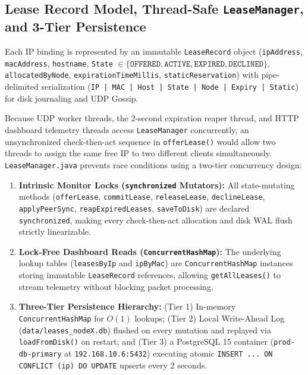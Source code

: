 \documentclass[11pt,a4paper]{article}
\begin{document}
\subsection{Lease Record Model, Thread-Safe \texttt{LeaseManager}, and 3-Tier Persistence}
Each IP binding is represented by an immutable \texttt{LeaseRecord} object (\texttt{ipAddress}, \texttt{macAddress}, \texttt{hostname}, \texttt{State} $\in \{\texttt{OFFERED}, \texttt{ACTIVE}, \texttt{EXPIRED}, \texttt{DECLINED}\}$, \texttt{allocatedByNode}, \texttt{expirationTimeMillis}, \texttt{staticReservation}) with pipe-delimited serialization (\texttt{IP | MAC | Host | State | Node | Expiry | Static}) for disk journaling and UDP Gossip.

Because UDP worker threads, the 2-second expiration reaper thread, and HTTP dashboard telemetry threads access \texttt{LeaseManager} concurrently, an unsynchronized check-then-act sequence in \texttt{offerLease()} would allow two threads to assign the same free IP to two different clients simultaneously. \texttt{LeaseManager.java} prevents race conditions using a two-tier concurrency design:
\begin{enumerate}[leftmargin=2em]
    \item \textbf{Intrinsic Monitor Locks (\texttt{synchronized} Mutators):} All state-mutating methods (\texttt{offerLease}, \texttt{commitLease}, \texttt{releaseLease}, \texttt{declineLease}, \texttt{applyPeerSync}, \texttt{reapExpiredLeases}, \texttt{saveToDisk}) are declared \texttt{synchronized}, making every check-then-act allocation and disk WAL flush strictly linearizable.
    \item \textbf{Lock-Free Dashboard Reads (\texttt{ConcurrentHashMap}):} The underlying lookup tables (\texttt{leasesByIp} and \texttt{ipByMac}) are \texttt{ConcurrentHashMap} instances storing immutable \texttt{LeaseRecord} references, allowing \texttt{getAllLeases()} to stream telemetry without blocking packet processing.
    \item \textbf{Three-Tier Persistence Hierarchy:} (Tier 1) In-memory \texttt{ConcurrentHashMap} for $O(1)$ lookups; (Tier 2) Local Write-Ahead Log (\texttt{data/leases\_nodeX.db}) flushed on every mutation and replayed via \texttt{loadFromDisk()} on restart; and (Tier 3) a PostgreSQL 15 container (\texttt{prod-db-primary} at \texttt{192.168.10.6:5432}) executing atomic \texttt{INSERT ... ON CONFLICT (ip) DO UPDATE} upserts every 2 seconds.
\end{enumerate}
\end{document}
